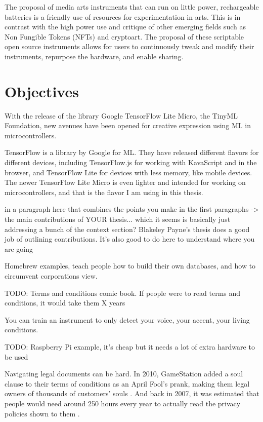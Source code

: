 The proposal of media arts instruments that can run on little power, rechargeable batteries is a friendly use of resources for experimentation in arts. This is in contrast with the high power use and critique of other emerging fields such as Non Fungible Tokens (NFTs) and cryptoart. The proposal of these scriptable open source instruments allows for users to continuously tweak and modify their instruments, repurpose the hardware, and enable sharing.

\section{Objectives}

With the release of the library Google TensorFlow Lite Micro, the TinyML Foundation, new avenues have been opened for creative expression using \acrshort{ML} in microcontrollers.

TensorFlow is a library by Google for \acrshort{ML}. They have released different flavors for different devices, including TensorFlow.js for working with KavaScript and in the browser, and TensorFlow Lite for devices with less memory, like mobile devices. The newer TensorFlow Lite Micro is even lighter and intended for working on microcontrollers, and that is the flavor I am using in this thesis.

in a paragraph here that combines the points you make in the first paragraphs -> the main contributions of YOUR thesis... which it seems is basically just addressing a bunch of the context section? Blakeley Payne's thesis does a good job of outlining contributions. It's also good to do here to understand where you are going

Homebrew examples, teach people how to build their own databases, and how to circumvent corporations view.

TODO: Terms and conditions comic book. If people were to read terms and conditions, it would take them X years

You can train an instrument to only detect your voice, your accent, your living conditions.

TODO: Raspberry Pi example, it’s cheap but it needs a lot of extra hardware to be used

Navigating legal documents can be hard. In 2010, GameStation added a soul clause to their terms of conditions as an April Fool's prank, making them legal owners of thousands of customers' souls \cite{website-huffpost-gamestation-soul-clause}. And back in 2007, it was estimated that people would need around 250 hours every year to actually read the privacy policies shown to them \cite{article-cost-of-reading-privacy-policies}.


